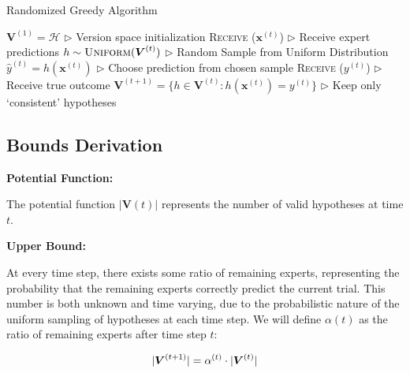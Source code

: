 \documentclass[11pt]{article}
\begin{document}
\begin{algorithm}[H]
\caption{Randomized Greedy Algorithm}
\label{algo:random-greedy}
\begin{algorithmic}[1]
\STATE $\boldsymbol{V}^{(1)} = \mathcal{H}$  \hfill $\triangleright$ Version space initialization
\STATE \textsc{Receive} ($\boldsymbol{x}^{(t)}$) \hfill $\triangleright$ Receive expert predictions
\STATE $h \sim \textsc{Uniform} (\boldsymbol{V}^{(t)})$ \hfill $\triangleright$ Random Sample from Uniform Distribution
\STATE $\hat{y}^{(t)} = h(\boldsymbol{x}^{(t)})$ \hfill $\triangleright$ Choose prediction from chosen sample
\STATE \textsc{Receive} ($y^{(t)}$) \hfill $\triangleright$ Receive true outcome
\STATE $\boldsymbol{V}^{(t+1)} = \big\{ h \in \boldsymbol{V}^{(t)} : h(\boldsymbol{x}^{(t)}) = y^{(t)} \big\} $ \hfill $\triangleright$ Keep only `consistent' hypotheses
\ENDFOR
\end{algorithmic}
\end{algorithm}

\subsection{Bounds Derivation}



\textbf{Potential Function:}
    
The potential function $|\boldsymbol{V}(t)|$ represents the number of valid hypotheses at time $t$.

\textbf{Upper Bound:}

At every time step, there exists some ratio of remaining experts, representing the probability that the remaining experts correctly predict the current trial. This number is both unknown and time varying, due to the probabilistic nature of the uniform sampling of hypotheses at each time step. We will define $\alpha(t)$ as the ratio of remaining experts after time step $t$:

\begin{equation}
\centering
|\boldsymbol{V}^{(t+1)}| = \alpha^{(t)} \cdot |\boldsymbol{V}^{(t)}|
\label{eq:alpha}
\end{equation}
\end{document}
